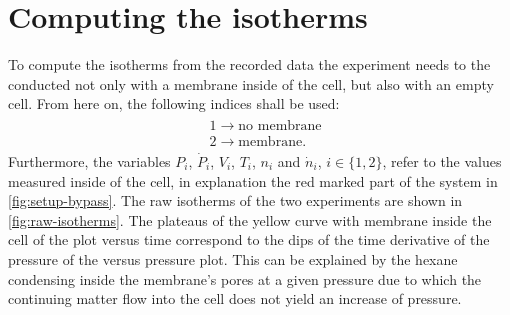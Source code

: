 \documentclass[../thesis.tex]{subfiles}
\begin{document}
    \section{Computing the isotherms}

        To compute the isotherms from the recorded data the experiment needs to the conducted not only with a membrane inside of the cell, but also with an empty cell. From here on, the following indices shall be used:
        \begin{align*}
            \begin{split}
                &1 \longrightarrow \textrm{no membrane} \\
                &2 \longrightarrow \textrm{membrane}.
                \label{eq:index_assignments}
            \end{split}
        \end{align*}
        Furthermore, the variables $P_i$, $\dot{P}_i$, $V_i$, $T_i$, $n_i$ and $\dot{n}_i$, $i\in \{1,2\}$, refer to the values measured inside of the cell, in explanation the red marked part of the system in \cref{fig:setup-bypass}. The raw isotherms of the two experiments are shown in \cref{fig:raw-isotherms}. The plateaus of the yellow curve with membrane inside the cell of the plot versus time  correspond to the dips of the time derivative of the pressure of the versus pressure plot. This can be explained by the hexane condensing inside the membrane's pores at a given pressure due to which the continuing matter flow into the cell does not yield an increase of pressure.
        \medskip
\end{document}
